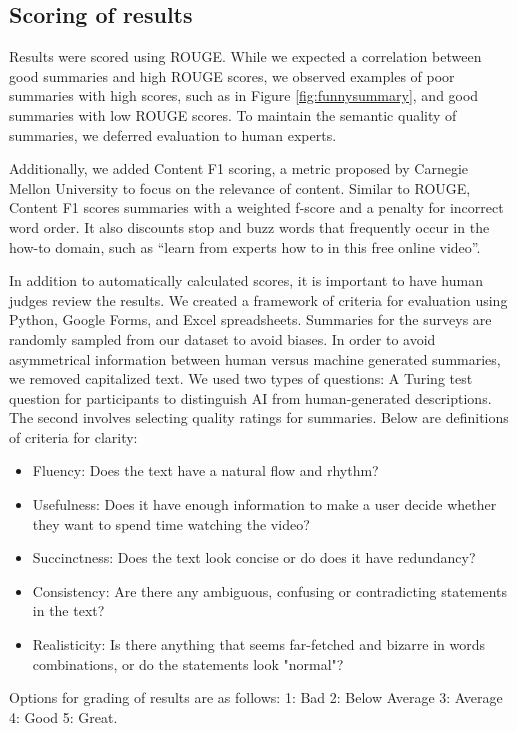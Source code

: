 \documentclass{article}
\begin{document}
\subsection{Scoring of results}
\label{Scoring}
Results were scored using ROUGE. While we expected a correlation between good summaries and high ROUGE scores, we observed examples of poor summaries with high scores, such as in Figure \ref{fig:funnysummary}, and good summaries with low ROUGE scores. To maintain the semantic quality of summaries, we deferred evaluation to human experts.

Additionally, we added Content F1 scoring, a metric proposed by Carnegie Mellon University to focus on the relevance of content. Similar to ROUGE, Content F1 scores summaries with a weighted f-score and a penalty for incorrect word order. It also discounts stop and buzz words that frequently occur in the how-to domain, such as “learn from experts how to in this free online video”.  

In addition to automatically calculated scores, it is important to have human judges review the results. We created a framework of criteria for evaluation using Python, Google Forms, and Excel spreadsheets. Summaries for the surveys are randomly sampled from our dataset to avoid biases. In order to avoid asymmetrical information between human versus machine generated summaries, we removed capitalized text. We used two types of questions: A Turing test question for participants to distinguish AI from human-generated descriptions. The second involves selecting quality ratings for summaries. Below are definitions of criteria for clarity:
\begin{itemize}

\item Fluency: Does the text have a natural flow and rhythm?
\item Usefulness: Does it have enough information to make a user decide whether they want to spend time watching the video?
\item Succinctness: Does the text look concise or do does it have redundancy?
\item Consistency: Are there any ambiguous, confusing or contradicting statements in the text?
\item Realisticity: Is there anything that seems far-fetched and bizarre in words combinations, or do the statements look "normal"?

\end{itemize}

Options for grading of results are as follows: 1: Bad   2: Below Average   3: Average   4: Good   5: Great.
\end{document}
